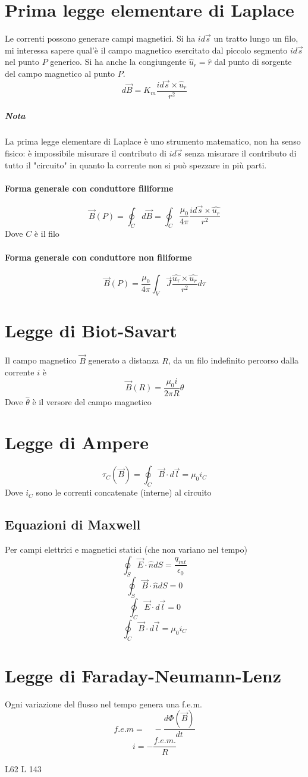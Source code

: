 \documentclass[a4paper]{report}
\begin{document}
  \section{Prima legge elementare di Laplace}
  Le correnti possono generare campi magnetici.
  Si ha $id\vec{s}$ un tratto lungo un filo, mi interessa sapere qual'è il campo magnetico esercitato dal piccolo segmento $id\vec{s}$ nel punto $P$ generico. Si ha anche la congiungente $\hat{u}_r=\hat{r}$ dal punto di sorgente del campo magnetico al punto $P$.
  $$ d\vec{B} = K_m \frac{id\vec{s} \times \hat{u}_r}{r^2} $$
  \subparagraph{Nota}
  La prima legge elementare di Laplace è uno strumento matematico, non ha senso fisico: è impossibile misurare il contributo di $id\vec{s}$ senza misurare il contributo di tutto il "circuito" in quanto la corrente non si può spezzare in più parti.
  \paragraph{Forma generale con conduttore filiforme}
  $$ \vec{B}(P) = \oint_C d\vec{B} = \oint_C \frac{\mu_0}{4\pi} \frac{id\vec{s} \times \hat{u_r}}{r^2}$$
  Dove $C$ è il filo
  \paragraph{Forma generale con conduttore non filiforme}
  $$ \vec{B}(P) = \frac{\mu_0}{4\pi} \int_V \vec{J}\frac{\hat{u_\tau} \times \hat{u_r}}{r^2} d\tau $$

  \section{Legge di Biot-Savart}
  Il campo magnetico $\vec{B}$ generato a distanza $R$, da un filo indefinito percorso dalla corrente $i$ è
  $$ \vec{B}(R) = \frac{\mu_0 i}{2 \pi R} \hat{\theta} $$
  Dove $\hat{\theta}$ è il versore del campo magnetico

  \section{Legge di Ampere}
  $$ \tau_C (\vec{B}) = \oint_C \vec{B} \cdot d\vec{l} = \mu_0 i_C $$
  Dove $i_C$ sono le correnti concatenate (interne) al circuito

  \subsection{Equazioni di Maxwell}
  Per campi elettrici e magnetici statici (che non variano nel tempo)
  $$ \oint_S \vec{E}\cdot \hat{n} dS = \frac{q_{int}}{\epsilon_0} $$
  $$ \oint_S \vec{B}\cdot \hat{n} dS = 0 $$
  $$ \oint_C \vec{E}\cdot d\vec{l} = 0 $$
  $$ \oint_C \vec{B} \cdot d\vec{l} = \mu_0 i_C $$

  \section{Legge di Faraday-Neumann-Lenz}
  Ogni variazione del flusso nel tempo genera una f.e.m.
  $$f.e.m = \quad -\frac{d\Phi(\vec{B})}{dt} $$
  $$ i = -\frac{f.e.m.}{R} $$

  L62
L 143
\end{document}

